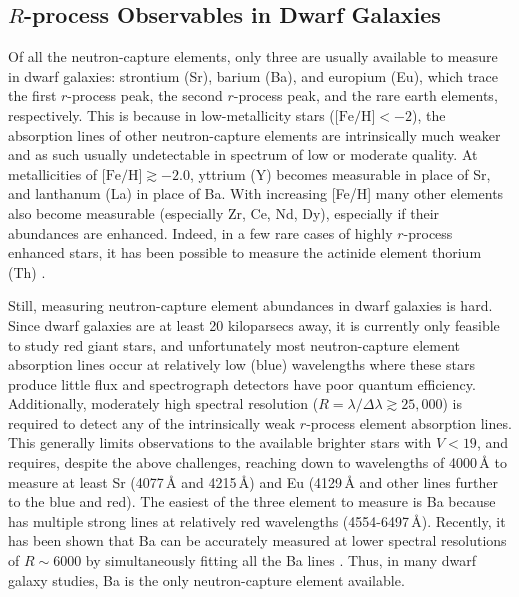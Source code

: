 \documentclass[letterpaper]{article}
\begin{document}
\subsection{$R$-process Observables in Dwarf Galaxies}

Of all the neutron-capture elements, only three are usually available to measure in dwarf galaxies: strontium (Sr), barium (Ba), and europium (Eu), which trace the first $r$-process peak, the second $r$-process peak, and the rare earth elements, respectively.
This is because in low-metallicity stars ($\mbox{[Fe/H]} < -2$), the absorption lines of other neutron-capture elements are intrinsically much weaker and as such usually undetectable in spectrum of low or moderate quality.
At metallicities of $\mbox{[Fe/H]} \gtrsim -2.0$, yttrium (Y) becomes measurable in place of Sr, and lanthanum (La) in place of Ba. With increasing [Fe/H] many other elements also become  measurable (especially Zr, Ce, Nd, Dy), especially if their abundances are enhanced.
Indeed, in a few rare cases of highly $r$-process enhanced stars, it has been possible to measure the actinide element thorium (Th) \citep{aoki2007_cos82,Ji2018,Hansen2018,Hansen2021,Reichert2021}.


Still, measuring neutron-capture element abundances in dwarf galaxies is hard.
Since dwarf galaxies are at least 20 kiloparsecs away, it is currently only feasible to study red giant stars, and unfortunately most neutron-capture element absorption lines occur at relatively low (blue) wavelengths where these stars produce little flux and spectrograph detectors have poor quantum efficiency. Additionally, moderately high spectral resolution ($R = \lambda/\Delta \lambda \gtrsim 25,000$) is required to detect any of the intrinsically weak $r$-process element absorption lines.
This generally limits observations to the available brighter stars with $V < 19$, and requires, despite the above challenges, reaching down to wavelengths of 4000\,{\AA} to measure at least Sr (4077\,{\AA} and 4215\,{\AA}) and Eu (4129\,{\AA} and other lines further to the blue and red).
The easiest of the three element to measure is Ba because has multiple strong lines at relatively red wavelengths (4554-6497\,{\AA}). Recently, it has been shown that Ba can be accurately measured at lower spectral resolutions of $R \sim 6000$ by simultaneously fitting all the Ba lines \citep{Duggan2018}. Thus, in many dwarf galaxy studies, Ba is the only neutron-capture element available.
\end{document}
